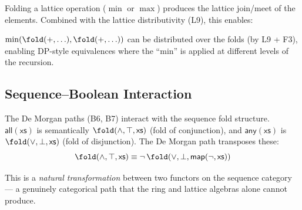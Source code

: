 Folding a lattice operation ($\min$ or $\max$) produces the
lattice join/meet of the elements.  Combined with the lattice
distributivity (L9), this enables:

\begin{proposition}
$\min(\fold(+, \ldots), \fold(+, \ldots))$ can be distributed
over the folds (by L9 + F3), enabling DP-style equivalences
where the ``min'' is applied at different levels of the recursion.
\end{proposition}

\subsection{Sequence--Boolean Interaction}

The De Morgan paths (B6, B7) interact with the sequence fold
structure.  $\mathsf{all}(\mathsf{xs})$ is semantically
$\fold(\land, \top, \mathsf{xs})$ (fold of conjunction), and
$\mathsf{any}(\mathsf{xs})$ is $\fold(\lor, \bot, \mathsf{xs})$
(fold of disjunction).  The De Morgan path transposes these:
\[
  \fold(\land, \top, \mathsf{xs}) \equiv
  \lnot\,\fold(\lor, \bot, \mathsf{map}(\lnot, \mathsf{xs}))
\]

This is a \emph{natural transformation} between two functors on
the sequence category --- a genuinely categorical path that the ring
and lattice algebras alone cannot produce.


